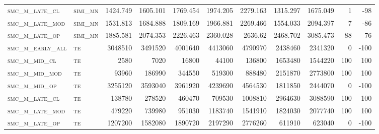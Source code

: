 \begin{landscape}
\begin{center}
\begin{footnotesize}
\begin{longtable}{llrrrrrr|rrr}
\textsc{smc\_m\_late\_cl  } & \textsc{simi\_mn  }   & 1424.749 & 1605.101 & 1769.454 & 1974.205 & 2279.163 & 1315.297    & 1675.049      & 1             & -98      \\
\textsc{smc\_m\_late\_mod } & \textsc{simi\_mn  }   & 1531.813 & 1684.888 & 1809.169 & 1966.881 & 2269.466 & 1554.033    & 2094.397      & 7             & -86      \\
\textsc{smc\_m\_late\_op  } & \textsc{simi\_mn  }   & 1885.581 & 2074.353 & 2226.463 & 2360.028 & 2636.62  & 2468.702    & 3085.473      & 88            & 76       \\
\textsc{smc\_m\_early\_all} & \textsc{te  	    }   & 3048510  & 3491520  & 4001640  & 4413060  & 4790970  & 2438460     & 2341320       & 0             & -100     \\
\textsc{smc\_m\_mid\_cl   } & \textsc{te        }   & 2580     & 7020     & 16800    & 44100    & 136800   & 1653480     & 1544220       & 100           & 100      \\
\textsc{smc\_m\_mid\_mod  } & \textsc{te        }   & 93960    & 186990   & 344550   & 519300   & 888480   & 2151870     & 2773800       & 100           & 100      \\
\textsc{smc\_m\_mid\_op   } & \textsc{te        }   & 3255120  & 3593040  & 3961920  & 4239690  & 4564530  & 1811850     & 2444070       & 0             & -100     \\
\textsc{smc\_m\_late\_cl  } & \textsc{te        }   & 138780   & 278520   & 460470   & 709530   & 1008810  & 2964630     & 3088590       & 100           & 100      \\
\textsc{smc\_m\_late\_mod } & \textsc{te        }   & 479220   & 739980   & 951030   & 1183740  & 1541910  & 1824030     & 2077740       & 100           & 100      \\
\textsc{smc\_m\_late\_op  } & \textsc{te        }   & 1207200  & 1582080  & 1890720  & 2197290  & 2776260  & 611910      & 623040        & 0             & -100    

\end{longtable}
\end{footnotesize}
\end{center}
\end{landscape}

\restoregeometry
\pagestyle{headings}



